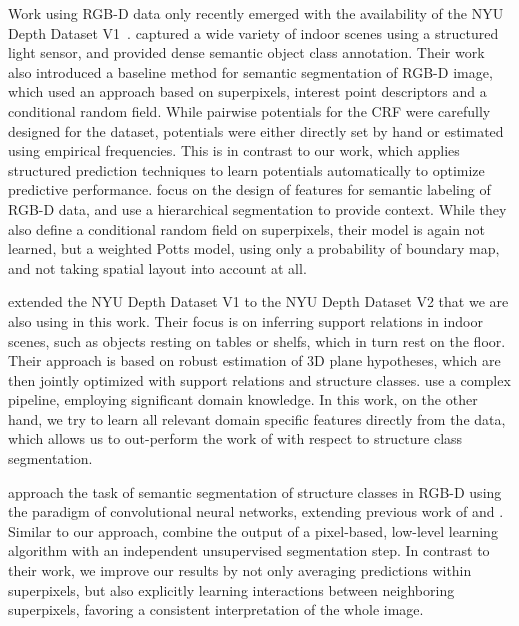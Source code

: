 \documentclass[a4paper, 10pt, conference]{ieeeconf}      %
\begin{document}
Work using RGB-D data only recently emerged with
the availability of the NYU Depth Dataset V1~\citep{silberman2011indoor}.
\citet{silberman2011indoor} captured a wide variety of indoor scenes using a structured light sensor,
and provided dense semantic object class annotation. Their work also introduced a baseline method
for semantic segmentation of RGB-D image, which used an approach based on superpixels, interest
point descriptors and a conditional random field. While pairwise potentials for the CRF were carefully
designed for the dataset, potentials were either directly set by hand or estimated using empirical
frequencies. This is in contrast to our work, which applies structured prediction techniques
to learn potentials automatically to optimize predictive performance.
\citet{ren2012rgb} focus on the design of features for semantic labeling of RGB-D data, and use
a hierarchical segmentation to provide context. While they also define a conditional random field on superpixels,
their model is again not learned, but a weighted Potts model, using only a
probability of boundary map, and not taking spatial layout into account at all.

\citet{SilbermanECCV12} extended the NYU Depth Dataset V1 to the NYU Depth Dataset V2 that we are also
using in this work.  Their focus is on inferring support relations in indoor
scenes, such as objects resting on tables or shelfs, which in turn rest on the floor.
Their approach is based on robust estimation of 3D plane hypotheses, which are then jointly
optimized with support relations and structure classes.
\citet{SilbermanECCV12} use a complex pipeline, employing significant domain knowledge.
In this work, on the other hand, we try to learn all relevant domain specific features
directly from the data, which allows us to out-perform the work of \citet{SilbermanECCV12}
with respect to structure class segmentation.

\citet{couprie-iclr-13} approach the task of semantic segmentation of structure classes
in RGB-D using the paradigm of convolutional neural networks, extending
previous work of \citet{farabet-pami-13} and \citet{schulz2012learning}.
Similar to our approach, \citet{couprie-iclr-13} combine the output of a
pixel-based, low-level learning algorithm with an independent unsupervised
segmentation step. In contrast to their work, we improve our results by not
only averaging predictions within superpixels, but also explicitly learning
interactions between neighboring superpixels, favoring a consistent
interpretation of the whole image.
\end{document}
